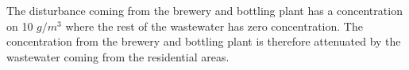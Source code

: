 The disturbance coming from the brewery and bottling plant has a concentration on 10 $g/m^3$ where the rest of the wastewater has zero concentration. The concentration from the brewery and bottling plant is therefore attenuated by the wastewater coming from the residential areas. 

